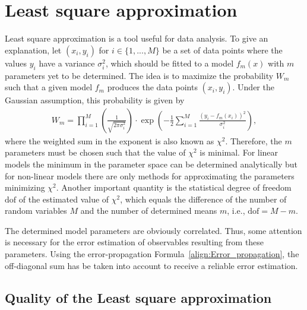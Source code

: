 
\section{Least square approximation}
\label{sec:LeasatSquare}

Least square approximation is a tool useful for data analysis. To give an explanation, let $(x_i,y_i)$ for $i\!\in\!\{1,...,M\}$
be a set of data points where the values $y_i$ have a variance $\sigma_i^2$, which should be fitted to a model $f_m(x)$ with $m$ 
parameters yet to be determined. The idea is to maximize the probability $W_m$ such that a given model $f_m$ produces the data points 
$(x_i,y_i)$. Under the Gaussian assumption, this probability is  given by 
\begin{align*}
    W_m=\prod_{i=1}^M\left(\frac{1}{\sqrt{2\pi\sigma_i^2}}\right)\cdot
      \exp\left(-\frac{1}{2}\sum_{i=1}^M\frac{(y_i-f_m(x_i))^2}{\sigma_i^2}\right),
\end{align*}
where the weighted sum in the exponent is also known as $\chi^2$. Therefore, the $m$ parameters must be chosen such that
the value of $\chi^2$ is minimal. For linear models the minimum in the parameter space can be determined analytically but for 
non-linear models there are only methods for approximating the parameters minimizing $\chi^2$. Another important
quantity is the statistical degree of freedom $\mathrm{dof}$ of the estimated value of $\chi^2$, which equals the difference of the 
number of random variables $M$ and the number of determined means $m$, i.e., $\mathrm{dof}\!=\!M\!-\!m$.~\cite[p.103]{Bevington2003}

The determined model parameters are obviously correlated. Thus, some attention is necessary for the error estimation of observables 
resulting from these parameters. Using the error-propagation Formula~\eqref{align:Error_propagation}, the off-diagonal sum has be
taken into account to receive a reliable error estimation. 

\subsection*{Quality of the Least square approximation}

